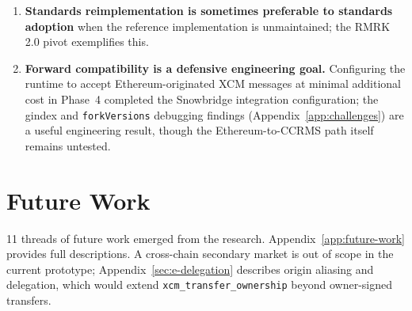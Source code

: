 \begin{enumerate}
\item \textbf{Standards reimplementation is sometimes preferable to standards adoption} when the reference implementation is unmaintained; the RMRK 2.0 pivot exemplifies this.
\item \textbf{Forward compatibility is a defensive engineering goal.} Configuring the runtime to accept Ethereum-originated XCM messages at minimal additional cost in Phase~4 completed the Snowbridge integration configuration; the gindex and \texttt{forkVersions} debugging findings (Appendix~\ref{app:challenges}) are a useful engineering result, though the Ethereum-to-CCRMS path itself remains untested.
\end{enumerate}

\section{Future Work}\label{sec:future-work}

11 threads of future work emerged from the research. Appendix~\ref{app:future-work} provides full descriptions. A cross-chain secondary market is out of scope in the current prototype; Appendix~\ref{sec:e-delegation} describes origin aliasing and delegation, which would extend \texttt{xcm\_transfer\_ownership} beyond owner-signed transfers.

